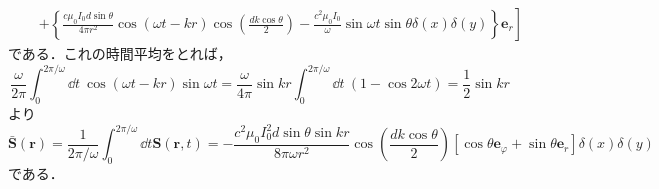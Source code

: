 \documentclass[a4paper,pdflatex,ja=standard]{bxjsarticle}
\begin{document}
\begin{enumerate}
\begin{align}
    &\quad
    \left.
      +
      \left\{  
        \frac{c\mu_{0}I_{0}d\sin\theta}{4\pi r^2}
        \cos(\omega t-kr)\cos\left( \frac{dk\cos\theta}{2} \right)
        -
        \frac{c^2\mu_{0}I_{0}}{\omega}\sin\omega t\sin\theta\delta(x)\delta(y)
      \right\}
      \bm{e}_{r}
    \right]
  \end{align}
  である．これの時間平均をとれば，
  \begin{equation}
    \frac{\omega}{2\pi}\int_{0}^{2\pi/\omega}
    \dd t\ 
    \cos(\omega t-kr)\sin\omega t
    =
    \frac{\omega}{4\pi}\sin kr
    \int_{0}^{2\pi/\omega}
    \dd t\ 
    (1-\cos2\omega t)
    =
    \frac{1}{2}\sin kr
  \end{equation}
  より
  \begin{equation}
    \bar{\bm{S}}(\bm{r})
    =
    \frac{1}{2\pi/\omega}
    \int_{0}^{2\pi/\omega}
    \dd t
    \bm{S}(\bm{r},t)
    =
    -
    \frac{c^{2}\mu_{0}I_{0}^{2}d\sin\theta\sin kr}{8\pi\omega r^2}
    \cos\left( \frac{dk\cos\theta}{2} \right)
    \left[  
      \cos\theta
      \bm{e}_{\varphi}
      +
      \sin\theta
      \bm{e}_{r}
    \right]
    \delta(x)\delta(y)
  \end{equation}
  である．


\end{enumerate}
\end{document}
